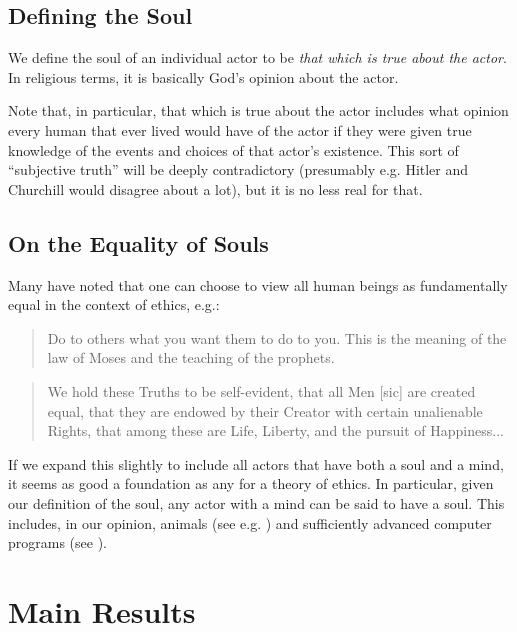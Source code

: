 \documentclass{article}
\begin{document}
\subsection{Defining the Soul}

We define the soul of an individual actor to be {\em that which is
  true about the actor}. In religious terms, it is basically God's
opinion about the actor.

Note that, in particular, that which is true about the actor includes
what opinion every human that ever lived would have of the actor if
they were given true knowledge of the events and choices of that
actor's existence. This sort of ``subjective truth'' will be deeply
contradictory (presumably e.g. Hitler and Churchill would disagree
about a lot), but it is no less real for that.

\subsection{On the Equality of Souls}

Many have noted that one can choose to view all human beings as
fundamentally equal in the context of ethics, e.g.:

\begin{quote}
  Do to others what you want them to do to you. This is the meaning of
  the law of Moses and the teaching of the prophets. \cite{mount}
\end{quote}

\begin{quote}
  We hold these Truths to be self-evident, that all Men [sic] are
  created equal, that they are endowed by their Creator with certain
  unalienable Rights, that among these are Life, Liberty, and the
  pursuit of Happiness... \cite{independence}
\end{quote}

If we expand this slightly to include all actors that have both a soul
and a mind, it seems as good a foundation as any for a theory of
ethics. In particular, given our definition of the soul, any actor
with a mind can be said to have a soul. This includes, in our opinion,
animals (see e.g. \cite{singer1995animal, coetzee1999lives}) and
sufficiently advanced computer programs (see
\cite{turing1954computing}).

\section{Main Results}
\end{document}
